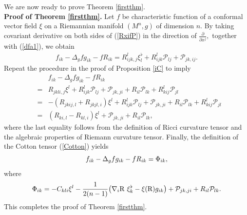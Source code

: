 \documentclass[10pt,leqno,oneside]{amsart}
\begin{document}
{           We are now ready to prove Theorem \ref{firstthm}.\\
    {\bf Proof of Theorem \ref{firstthm}.} Let $f$ be characteristic function of a conformal vector field $\xi$ on a Riemannian manifold $(M^n, g)$ of dimension $n$. By taking covariant derivative on both sides of (\ref{RxifP}) in the direction of $\frac{\partial}{\partial x^j},$ together with (\ref{dfa1}), we obtain
          \begin{eqnarray}
             f_{ik}-\Delta_gfg_{ik}-fR_{ik}= R_{ijk,j}^l\xi_l^{\flat}+R_{ijk}^l\mathcal{P}_{lj}+\mathcal{P}_{jk,ij}.
          \end{eqnarray}
          Repeat the procedure in the proof of Proposition \ref{iC} to imply
          \begin{eqnarray*}
          &&f_{ik}-\Delta_gfg_{ik}-fR_{ik}\\
             &=&R_{jkli,j}\xi^l+R_{ijk}^l\mathcal{P}_{lj}+\mathcal{P}_{jk,ji}+R_{il}\mathcal{P}_{lk}+R^l_{kij}\mathcal{P}_{jl}\\
             &=&-(R_{jkij,l}+R_{jkjl,i})\xi^l+R_{ijk}^l\mathcal{P}_{lj}+\mathcal{P}_{jk,ji}+R_{il}\mathcal{P}_{lk}+R^l_{kij}\mathcal{P}_{jl}\\
             &=&(R_{ki,l}-R_{kl,i})\xi^l+\mathcal{P}_{jk,ji}+R_{il}\mathcal{P}_{lk},
          \end{eqnarray*}
          where the last equality follows from the definition of Ricci curvature tensor and the algebraic properties of Riemann curvature tensor. Finally, the definition of the Cotton tensor (\ref{Cotton}) yields
          \[f_{ik}-\Delta_gfg_{ik}-fR_{ik}={\rm\Phi}_{ik},\]
          where
          \begin{equation}\label{Phi}
           {\rm\Phi}_{ik}=-C_{kli}\xi^l-\frac{1}{2(n-1)}\big(\nabla_i{\rm{R}} ~\xi_k^{\flat}-\xi({\rm{R}})g_{ik}\big)+\mathcal{P}_{jk,ji}+R_{il}\mathcal{P}_{lk}.
          \end{equation}
          This completes the proof of Theorem \ref{firstthm}.

}
\end{document}

